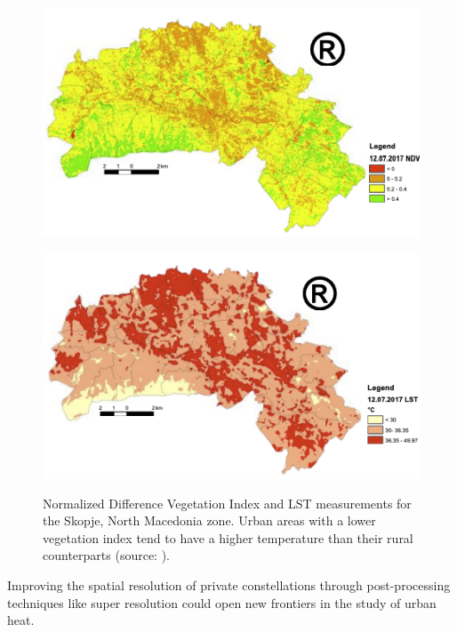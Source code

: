     \begin{figure}[H]
        \centering
        \begin{minipage}{0.75\textwidth}
            \centering
            \includegraphics[width=\textwidth]{Includes/1-skopje-NDVI.png}
            \label{fig:1-skopje-NDVI}
        \end{minipage}\hfill
        \begin{minipage}{0.75\textwidth}
            \centering
            \includegraphics[width=\textwidth]{Includes/1-skopje-LST.png}
            \label{fig:1-skopje-LST}
        \end{minipage}
        \caption{Normalized Difference Vegetation Index \cite{Rouse1973MonitoringVS} and LST measurements for the Skopje, North Macedonia zone. Urban areas with a lower vegetation index tend to have a higher temperature than their rural counterparts (source: \cite{skopje2018}).} 
        \label{fig:1-skopie-UHI}
    \end{figure}

    Improving the spatial resolution of private constellations through post-processing techniques like super resolution could open new frontiers in the study of urban heat. 


